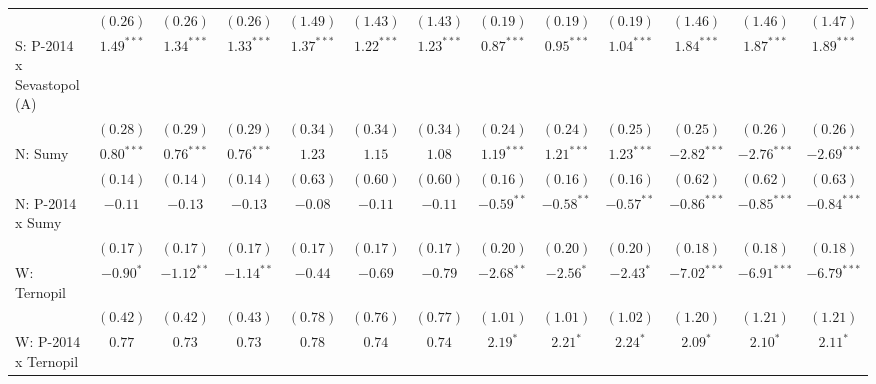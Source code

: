 \begin{table}
\begin{center}
\begin{tiny}
\begin{tabular}{l c c c c c c c c c c c c}
                            & $(0.26)$      & $(0.26)$      & $(0.26)$      & $(1.49)$     & $(1.43)$     & $(1.43)$     & $(0.19)$      & $(0.19)$      & $(0.19)$       & $(1.46)$      & $(1.46)$      & $(1.47)$      \\
S: P-2014 x Sevastopol (A)  & $1.49^{***}$  & $1.34^{***}$  & $1.33^{***}$  & $1.37^{***}$ & $1.22^{***}$ & $1.23^{***}$ & $0.87^{***}$  & $0.95^{***}$  & $1.04^{***}$   & $1.84^{***}$  & $1.87^{***}$  & $1.89^{***}$  \\
                            & $(0.28)$      & $(0.29)$      & $(0.29)$      & $(0.34)$     & $(0.34)$     & $(0.34)$     & $(0.24)$      & $(0.24)$      & $(0.25)$       & $(0.25)$      & $(0.26)$      & $(0.26)$      \\
N: Sumy                     & $0.80^{***}$  & $0.76^{***}$  & $0.76^{***}$  & $1.23$       & $1.15$       & $1.08$       & $1.19^{***}$  & $1.21^{***}$  & $1.23^{***}$   & $-2.82^{***}$ & $-2.76^{***}$ & $-2.69^{***}$ \\
                            & $(0.14)$      & $(0.14)$      & $(0.14)$      & $(0.63)$     & $(0.60)$     & $(0.60)$     & $(0.16)$      & $(0.16)$      & $(0.16)$       & $(0.62)$      & $(0.62)$      & $(0.63)$      \\
N: P-2014 x Sumy            & $-0.11$       & $-0.13$       & $-0.13$       & $-0.08$      & $-0.11$      & $-0.11$      & $-0.59^{**}$  & $-0.58^{**}$  & $-0.57^{**}$   & $-0.86^{***}$ & $-0.85^{***}$ & $-0.84^{***}$ \\
                            & $(0.17)$      & $(0.17)$      & $(0.17)$      & $(0.17)$     & $(0.17)$     & $(0.17)$     & $(0.20)$      & $(0.20)$      & $(0.20)$       & $(0.18)$      & $(0.18)$      & $(0.18)$      \\
W: Ternopil                 & $-0.90^{*}$   & $-1.12^{**}$  & $-1.14^{**}$  & $-0.44$      & $-0.69$      & $-0.79$      & $-2.68^{**}$  & $-2.56^{*}$   & $-2.43^{*}$    & $-7.02^{***}$ & $-6.91^{***}$ & $-6.79^{***}$ \\
                            & $(0.42)$      & $(0.42)$      & $(0.43)$      & $(0.78)$     & $(0.76)$     & $(0.77)$     & $(1.01)$      & $(1.01)$      & $(1.02)$       & $(1.20)$      & $(1.21)$      & $(1.21)$      \\
W: P-2014 x Ternopil        & $0.77$        & $0.73$        & $0.73$        & $0.78$       & $0.74$       & $0.74$       & $2.19^{*}$    & $2.21^{*}$    & $2.24^{*}$     & $2.09^{*}$    & $2.10^{*}$    & $2.11^{*}$    \\

\end{tabular}
\end{tiny}
\end{center}
\end{table}
